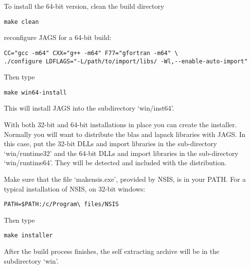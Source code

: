 \documentclass[11pt, a4paper, titlepage]{article}
\newcommand{\file}[1]{{`\normalfont\textsf{#1}'}}
\begin{document}
To install the 64-bit version, clean the build directory 
\begin{verbatim}
make clean 
\end{verbatim}
reconfigure JAGS for a 64-bit build:
\begin{verbatim}
CC="gcc -m64" CXX="g++ -m64" F77="gfortran -m64" \
./configure LDFLAGS="-L/path/to/import/libs/ -Wl,--enable-auto-import" 
\end{verbatim}
Then type
\begin{verbatim}
make win64-install
\end{verbatim}
This will install JAGS into the subdirectory \file{win/inst64}.

With both 32-bit and 64-bit installations in place you can create the
installer.  Normally you will want to distribute the blas and lapack
libraries with JAGS.  In this case, put the 32-bit DLLs and import
libraries in the sub-directory \file{win/runtime32} and the 64-bit
DLLs and import libraries in the sub-directory
\file{win/runtime64}. They will be detected and included with the
distribution.

Make sure that the file \file{makensis.exe}, provided by
NSIS, is in your PATH. For a typical installation of NSIS, on 32-bit
windows:
\begin{verbatim}
PATH=$PATH:/c/Program\ files/NSIS
\end{verbatim}
Then type
\begin{verbatim}
make installer
\end{verbatim}
After the build process finishes, the self extracting archive will be
in the subdirectory \file{win}.
\end{document}
